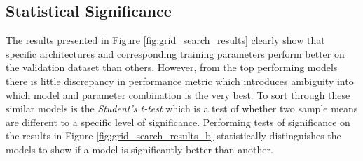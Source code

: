 \subsection{Statistical Significance}
The results presented in Figure \ref{fig:grid_search_results} clearly show that specific architectures and corresponding training parameters perform better on the validation dataset than others. However, from the top performing models there is little discrepancy in performance metric which introduces ambiguity into which model and parameter combination is the very best. To sort through these similar models is the \textit{Student's t-test} which is a test of whether two sample means are different to a specific level of significance. Performing tests of significance on the results in Figure \ref{fig:grid_search_results_b} statistically distinguishes the models to show if a model is significantly better than another.


